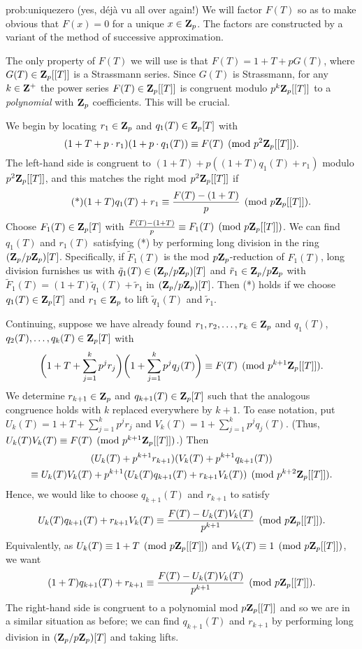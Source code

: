 \begin{sol}{prob:uniquezero} (yes, déjà vu all over again!) We will factor $F(T)$ so as to make obvious that $F(x)=0$ for a unique $x \in \mathbf{Z}_p$. The factors are constructed by a variant of the method of successive approximation. 

The only property of $F(T)$ we will use is that $F(T) = 1 + T + p G(T)$, where $G(T) \in \mathbf{Z}_p[[T]]$ is a Strassmann series. Since $G(T)$ is Strassmann, for any $k\in \mathbf{Z}^{+}$ the power series $F(T)\in \mathbf{Z}_p[[T]]$ is congruent modulo $p^k\mathbf{Z}_p[[T]]$ to a \emph{polynomial} with $\mathbf{Z}_p$ coefficients. This will be crucial.

We begin by locating $r_1 \in \mathbf{Z}_p$ and $q_1(T) \in \mathbf{Z}_p[T]$ with 
\begin{equation*} (1+T+p\cdot r_1)(1 + p\cdot q_1(T))\equiv F(T) \pmod{p^2\mathbf{Z}_p[[T]]}. \end{equation*}
The left-hand side is congruent to $(1+T) + p ((1+T) q_1(T) + r_1)$ modulo $p^2\mathbf{Z}_p[[T]]$, and this matches the right mod $p^2\mathbf{Z}_p[[T]]$ if
\begin{equation}\tag{*} (1+T) q_1(T) +  r_1 \equiv \frac{F(T)-(1+T)}{p}\pmod {p\mathbf{Z}_p[[T]]}. \end{equation}
Choose $F_1(T) \in \mathbf{Z}_p[T]$ with $\frac{F(T)-(1+T)}{p}\equiv F_1(T) \pmod{p\mathbf{Z}_p[[T]]}$. We can find $q_1(T)$ and $r_1(T)$ satisfying (*) by performing long division in the ring $(\mathbf{Z}_p/p\mathbf{Z}_p)[T]$. Specifically, if $\tilde{F}_1(T)$ is the mod  $p\mathbf{Z}_p$-reduction of $F_1(T)$, long division furnishes us with $\tilde{q}_1(T) \in (\mathbf{Z}_p/p\mathbf{Z}_p)[T]$ and $\tilde{r}_1 \in \mathbf{Z}_p/p\mathbf{Z}_p$ with $\tilde{F}_1(T) = (1+T) \tilde{q}_1(T) + \tilde{r}_1$ in $(\mathbf{Z}_p/p\mathbf{Z}_p)[T]$. Then (*) holds if we choose $q_1(T) \in \mathbf{Z}_p[T]$ and $r_1 \in \mathbf{Z}_p$ to lift $\tilde{q}_1(T)$ and $\tilde{r}_1$.

Continuing, suppose we have already found $r_1, r_2, \dots, r_k \in \mathbf{Z}_p$ and $q_1(T)$, $q_2(T), \dots, q_k(T) \in \mathbf{Z}_p[T]$ with
\[ \bigg(1+T + \sum_{j=1}^{k} p^j r_j\bigg)\bigg(1 + \sum_{j=1}^{k} p^j q_j(T)\bigg) \equiv F(T)\pmod{p^{k+1}\mathbf{Z}_p[[T]]}.  \]
We determine $r_{k+1} \in \mathbf{Z}_p$ and $q_{k+1}(T) \in \mathbf{Z}_p[T]$ such that the analogous congruence holds with $k$ replaced everywhere by $k+1$. To ease notation, put $U_k(T) = 1+T + \sum_{j=1}^{k} p^j r_j$ and $V_k(T)= 1+\sum_{j=1}^{k} p^j q_j(T)$. (Thus, $U_k(T) V_k(T) \equiv F(T) \pmod{p^{k+1}\mathbf{Z}_p[[T]]}$.) Then 
\begin{multline*}(U_k(T) + p^{k+1} r_{k+1})(V_{k}(T) + p^{k+1} q_{k+1}(T)) \\ \equiv U_k(T) V_k(T) + p^{k+1} (U_k(T) q_{k+1}(T) + r_{k+1} V_k(T))\pmod{p^{k+2}\mathbf{Z}_{p}[[T]]}.\end{multline*} Hence, we would like to choose $q_{k+1}(T)$ and $r_{k+1}$ to satisfy
\[ U_k(T) q_{k+1}(T) + r_{k+1} V_k(T) \equiv \frac{F(T) -U_k(T) V_k(T)}{p^{k+1}} \pmod{p\mathbf{Z}_p[[T]]}. \]
Equivalently, as $U_k(T) \equiv 1+T\pmod{p\mathbf{Z}_p[[T]]}$ and $V_k(T) \equiv 1\pmod{p\mathbf{Z}_p[[T]]}$, we want
\[ (1+T) q_{k+1}(T) + r_{k+1}\equiv \frac{F(T) -U_k(T) V_k(T)}{p^{k+1}} \pmod{p\mathbf{Z}_p[[T]]}. \]
The right-hand side is congruent to a polynomial mod $p\mathbf{Z}_p[[T]]$ and so we are in a similar situation as before; we can find $q_{k+1}(T)$ and $r_{k+1}$ by performing long division in $(\mathbf{Z}_p/p\mathbf{Z}_p)[T]$ and taking lifts. 


\end{sol}
